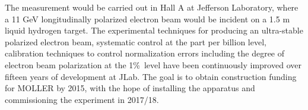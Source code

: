 The measurement would be carried out in Hall A at Jefferson Laboratory, where a 11 GeV longitudinally polarized electron beam would be incident on a 1.5 m liquid hydrogen target.
The experimental techniques for producing an ultra-stable polarized electron beam, systematic
control at the part per billion level, calibration techniques to control normalization errors including the degree of electron 
beam polarization at the 1\%\ level have been continuously improved over fifteen years of development at JLab. The goal is to obtain construction funding for MOLLER by 2015, with 
the hope of installing the apparatus and commissioning the experiment in 2017/18.


 


